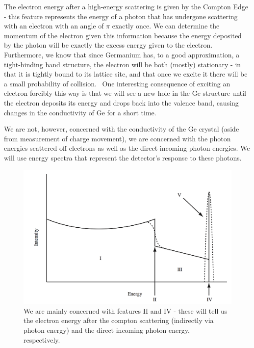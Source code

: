 \documentclass[reprint, nobibnotes, amssymb, amsmath, amsfonts, physics, mathtools, mathrsfs, floatfix]{revtex4-1}
\begin{document}
    The electron energy after a high-energy scattering is given by the Compton Edge - this feature represents the energy of a photon that has undergone scattering with an electron with an angle of $\pi$ exactly once.  We can determine the momentum of the electron given this information because the energy deposited by the photon will be exactly the excess energy given to the electron.  Furthermore, we know that since Germanium has, to a good approximation, a tight-binding band structure, the electron will be both (mostly) stationary - in that it is tightly bound to its lattice site, and that once we excite it there will be a small probability of collision.~\cite{germanium_structure}  One interesting consequence of exciting an electron forcibly this way is that we will see a new hole in the Ge structure until the electron deposits its energy and drops back into the valence band, causing changes in the conductivity of Ge for a short time.

    \hspace{.25cm}

    We are not, however, concerned with the conductivity of the Ge crystal (aside from measurement of charge movement), we are concerned with the photon energies scattered off electrons as well as the direct incoming photon energies.  We will use energy spectra that represent the detector's response to these photons.

    \begin{figure}[h]
      \centering
      \includegraphics[width=\linewidth]{energy_spectrum.png}
      \caption{We are mainly concerned with features II and IV - these will tell us the electron energy after the compton scattering (indirectly via photon energy) and the direct incoming photon energy, respectively.~\cite{lab_manual} \label{fig:labeled_spectrum}}
    \end{figure}
\end{document}
